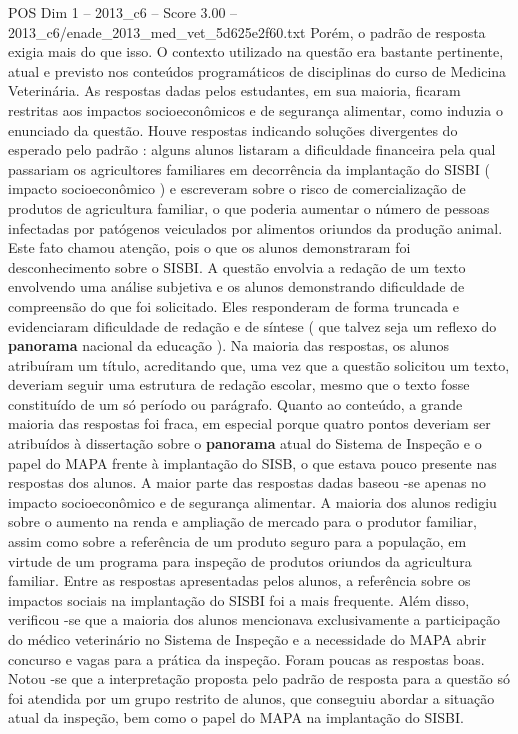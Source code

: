 \begin{textsample}{POS Dim 1 – 2013\_c6 – Score 3.00 – 2013\_c6/enade\_2013\_med\_vet\_5d625e2f60.txt}
Porém, o padrão de resposta exigia mais do que isso.
O contexto utilizado na questão era bastante pertinente, atual e previsto nos conteúdos programáticos de disciplinas do curso de Medicina Veterinária.
As respostas dadas pelos estudantes, em sua maioria, ficaram restritas aos impactos socioeconômicos e de segurança alimentar, como induzia o enunciado da questão.
Houve respostas indicando soluções divergentes do esperado pelo padrão : alguns alunos listaram a dificuldade financeira pela qual passariam os agricultores familiares em decorrência da implantação do SISBI ( impacto socioeconômico ) e escreveram sobre o risco de comercialização de produtos de agricultura familiar, o que poderia aumentar o número de pessoas infectadas por patógenos veiculados por alimentos oriundos da produção animal.
Este fato chamou atenção, pois o que os alunos demonstraram foi desconhecimento sobre o SISBI.
A questão envolvia a redação de um texto envolvendo uma análise subjetiva e os alunos demonstrando dificuldade de compreensão do que foi solicitado.
Eles responderam de forma truncada e evidenciaram dificuldade de redação e de síntese ( que talvez seja um reflexo do \textbf{panorama} nacional da educação ).
Na maioria das respostas, os alunos atribuíram um título, acreditando que, uma vez que a questão solicitou um texto, deveriam seguir uma estrutura de redação escolar, mesmo que o texto fosse constituído de um só período ou parágrafo.
Quanto ao conteúdo, a grande maioria das respostas foi fraca, em especial porque quatro pontos deveriam ser atribuídos à dissertação sobre o \textbf{panorama} atual do Sistema de Inspeção e o papel do MAPA frente à implantação do SISB, o que estava pouco presente nas respostas dos alunos.
A maior parte das respostas dadas baseou -se apenas no impacto socioeconômico e de segurança alimentar.
A maioria dos alunos redigiu sobre o aumento na renda e ampliação de mercado para o produtor familiar, assim como sobre a referência de um produto seguro para a população, em virtude de um programa para inspeção de produtos oriundos da agricultura familiar.
Entre as respostas apresentadas pelos alunos, a referência sobre os impactos sociais na implantação do SISBI foi a mais frequente.
Além disso, verificou -se que a maioria dos alunos mencionava exclusivamente a participação do médico veterinário no Sistema de Inspeção e a necessidade do MAPA abrir concurso e vagas para a prática da inspeção.
Foram poucas as respostas boas.
Notou -se que a interpretação proposta pelo padrão de resposta para a questão só foi atendida por um grupo restrito de alunos, que conseguiu abordar a situação atual da inspeção, bem como o papel do MAPA na implantação do SISBI.

\end{textsample}
